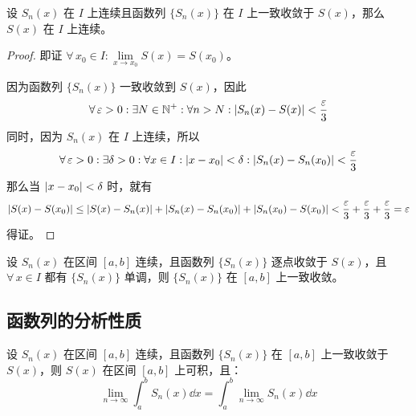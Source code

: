 \begin{theorem}
    设 $S_n(x)$ 在 $I$ 上连续且函数列 $\{S_n(x)\}$ 在 $I$ 上一致收敛于 $S(x)$，那么 $S(x)$ 在 $I$ 上连续。
    \begin{proof}
        即证 $\forall\,x_0 \in I: \lim\limits_{x \to x_0} S(x) = S(x_0)$。

        因为函数列 $\{S_n(x)\}$ 一致收敛到 $S(x)$，因此
        $$
        \forall\,\varepsilon > 0: \exists N \in \mathbb{N}^{+}: \forall n > N: \abs{S_n(x) - S(x)} < \frac{\varepsilon}{3}
        $$
        同时，因为 $S_n(x)$ 在 $I$ 上连续，所以
        $$
        \forall\,\varepsilon > 0: \exists \delta > 0: \forall x \in I: \abs{x - x_0} < \delta: \abs{S_n(x) - S_n(x_0)} < \frac{\varepsilon}{3}
        $$
        那么当 $\abs{x - x_0} < \delta$ 时，就有
        $$
        \abs{S(x) - S(x_0)} \le \abs{S(x) - S_n(x)} + \abs{S_n(x) - S_n(x_0)} + \abs{S_n(x_0) - S(x_0)} < \frac{\varepsilon}{3} + \frac{\varepsilon}{3} + \frac{\varepsilon}{3} = \varepsilon
        $$
        得证。
    \end{proof}
\end{theorem}

\begin{theorem}[Dini 定理]
    设 $S_n(x)$ 在区间 $[a, b]$ 连续，且函数列 $\{S_n(x)\}$ 逐点收敛于 $S(x)$，且 $\forall\,x \in I$ 都有 $\{S_n(x)\}$ 单调，则 $\{S_n(x)\}$ 在 $[a, b]$ 上一致收敛。
\end{theorem}

\subsection{函数列的分析性质}

\begin{theorem}[函数列的极限函数的可积性]
    设 $S_n(x)$ 在区间 $[a, b]$ 连续，且函数列 $\{S_n(x)\}$ 在 $[a, b]$ 上一致收敛于 $S(x)$，则 $S(x)$ 在区间 $[a, b]$ 上可积，且：
    $$
    \lim_{n \to \infty} \int_a^b S_n(x) \dd{x} = \int_a^b \lim_{n \to \infty} S_n(x) \dd{x}
    $$
\end{theorem}